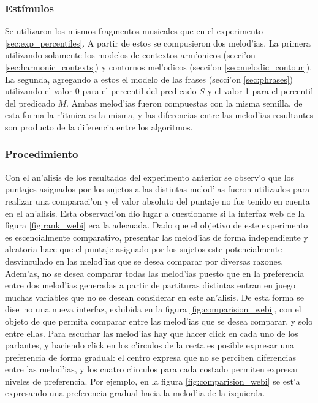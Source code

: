 \subsubsection{Est\'imulos}
Se utilizaron los mismos fragmentos musicales que en el experimento \ref{sec:exp_percentiles}. A partir de estos se compusieron 
dos melod'ias. La primera utilizando solamente los modelos de contextos arm'onicos (secci'on \ref{sec:harmonic_contexts}) y
contornos mel'odicos (secci'on \ref{sec:melodic_contour}). La segunda, agregando a estos el modelo de las frases (secci'on 
\ref{sec:phrases}) utilizando el valor 0 para el percentil del predicado $S$ y el valor 1 para el percentil del predicado $M$.
Ambas melod'ias fueron compuestas con la misma semilla, de esta forma la r'itmica es la misma, y las diferencias entre las 
melod'ias resultantes son producto de la diferencia entre los algoritmos.

\subsubsection{Procedimiento}
Con el an'alisis de los resultados del experimento anterior se observ'o que los puntajes asignados por los sujetos a las distintas melod'ias 
fueron utilizados para realizar una comparaci'on y el valor absoluto del puntaje no fue tenido en cuenta en el an'alisis. 
Esta observaci'on dio lugar a cuestionarse si la interfaz web de la figura \ref{fig:rank_webi} era la adecuada. Dado que el objetivo de este
experimento es escencialmente comparativo, presentar las melod'ias de forma independiente y aleatoria hace que el puntaje asignado por los sujetos 
este potencialmente desvinculado en las melod'ias que se desea comparar por diversas razones. 
Adem'as, no se desea comparar todas las melod'ias puesto que en la preferencia entre dos melod'ias generadas a partir de partituras distintas entran 
en juego muchas variables que no se desean considerar en este an'alisis.
De esta forma se dise~no una nueva interfaz, exhibida en la figura \ref{fig:comparision_webi}, con el objeto de que permita comparar entre las melod'ias 
que se desea comparar, y solo entre ellas. Para escuchar las melod'ias hay que hacer click en cada uno de los parlantes, y haciendo click en los c'irculos
de la recta es posible expresar una preferencia de forma gradual: el centro expresa que no se perciben diferencias entre las melod'ias, y los cuatro c'irculos
para cada costado permiten expresar niveles de preferencia. Por ejemplo, en la figura \ref{fig:comparision_webi} se est'a expresando una preferencia 
gradual hacia la melod'ia de la izquierda.

